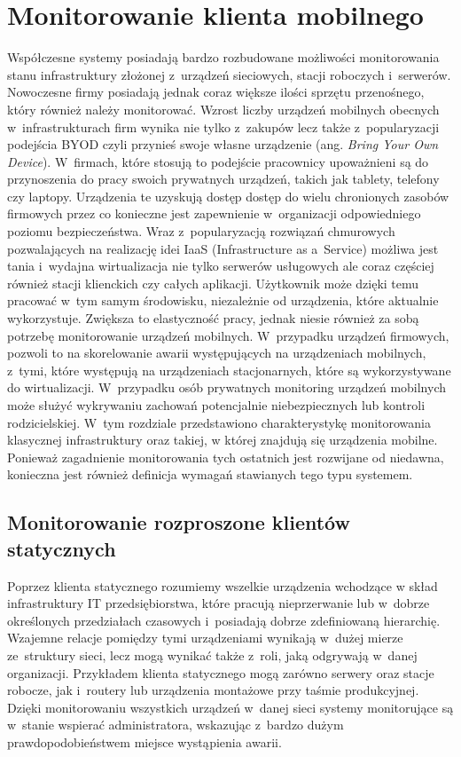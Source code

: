 \chapter{Monitorowanie klienta mobilnego}
\label{chap:Wymagania}

Współczesne systemy posiadają bardzo rozbudowane możliwości
monitorowania stanu infrastruktury złożonej z~urządzeń sieciowych,
stacji roboczych i~serwerów. Nowoczesne firmy posiadają jednak coraz
większe ilości sprzętu przenośnego, który również należy
monitorować. Wzrost liczby urządzeń mobilnych obecnych
w~infrastrukturach firm wynika nie tylko z~zakupów lecz także
z~popularyzacji podejścia BYOD czyli przynieś swoje własne urządzenie
(ang. {\em Bring Your Own Device}). W~firmach, które stosują to
podejście pracownicy upoważnieni są do przynoszenia do pracy swoich
prywatnych urządzeń, takich jak tablety, telefony czy
laptopy. Urządzenia te uzyskują dostęp dostęp do wielu chronionych
zasobów firmowych przez co konieczne jest zapewnienie w~organizacji
odpowiedniego poziomu bezpieczeństwa. Wraz z~popularyzacją rozwiązań
chmurowych pozwalających na realizację idei IaaS (Infrastructure as
a~Service) możliwa jest tania i~wydajna wirtualizacja nie tylko
serwerów usługowych ale coraz częściej również stacji klienckich czy
całych aplikacji. Użytkownik może dzięki temu pracować w~tym samym
środowisku, niezależnie od urządzenia, które aktualnie
wykorzystuje. Zwiększa to elastyczność pracy, jednak niesie również za
sobą potrzebę monitorowanie urządzeń mobilnych. W~przypadku urządzeń
firmowych, pozwoli to na skorelowanie awarii występujących na
urządzeniach mobilnych, z~tymi, które występują na urządzeniach
stacjonarnych, które są wykorzystywane do wirtualizacji. W~przypadku
osób prywatnych monitoring urządzeń mobilnych może służyć wykrywaniu
zachowań potencjalnie niebezpiecznych lub kontroli rodzicielskiej.
W~tym rozdziale przedstawiono charakterystykę monitorowania klasycznej
infrastruktury oraz takiej, w której znajdują się urządzenia
mobilne. Ponieważ zagadnienie monitorowania tych ostatnich jest
rozwijane od niedawna, konieczna jest również definicja wymagań
stawianych tego typu systemem.

\section[Monitorowanie rozproszone][Monitorowanie rozproszone klientów
statycznych]{Monitorowanie rozproszone klientów statycznych}

Poprzez klienta statycznego rozumiemy wszelkie urządzenia wchodzące w
skład infrastruktury IT przedsiębiorstwa, które pracują nieprzerwanie
lub w~dobrze określonych przedziałach czasowych i~posiadają dobrze
zdefiniowaną hierarchię. Wzajemne relacje pomiędzy tymi urządzeniami
wynikają w~dużej mierze ze~struktury sieci, lecz mogą wynikać także
z~roli, jaką odgrywają w~danej organizacji. Przykładem klienta
statycznego mogą zarówno serwery oraz stacje robocze, jak i~routery
lub urządzenia montażowe przy taśmie produkcyjnej. Dzięki
monitorowaniu wszystkich urządzeń w~danej sieci systemy monitorujące
są w~stanie wspierać administratora, wskazując z~bardzo dużym
prawdopodobieństwem miejsce wystąpienia awarii.


